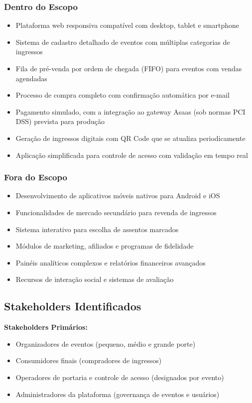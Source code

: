 \subsubsection{Dentro do Escopo}
\begin{itemize}
    \item Plataforma web responsiva compatível com desktop, tablet e smartphone
    \item Sistema de cadastro detalhado de eventos com múltiplas categorias de ingressos
    \item Fila de pré-venda por ordem de chegada (FIFO) para eventos com vendas agendadas
    \item Processo de compra completo com confirmação automática por e-mail
    \item Pagamento simulado, com a integração ao gateway Asaas (sob normas PCI DSS) prevista para produção
    \item Geração de ingressos digitais com QR Code que se atualiza periodicamente
    \item Aplicação simplificada para controle de acesso com validação em tempo real
\end{itemize}

\subsubsection{Fora do Escopo}
\begin{itemize}
    \item Desenvolvimento de aplicativos móveis nativos para Android e iOS
    \item Funcionalidades de mercado secundário para revenda de ingressos
    \item Sistema interativo para escolha de assentos marcados
    \item Módulos de marketing, afiliados e programas de fidelidade
    \item Painéis analíticos complexos e relatórios financeiros avançados
    \item Recursos de interação social e sistemas de avaliação
\end{itemize}

\subsection{Stakeholders Identificados}

\textbf{Stakeholders Primários:}
\begin{itemize}
    \item Organizadores de eventos (pequeno, médio e grande porte)
    \item Consumidores finais (compradores de ingressos)
    \item Operadores de portaria e controle de acesso (designados por evento)
    \item Administradores da plataforma (governança de eventos e usuários)
\end{itemize}

